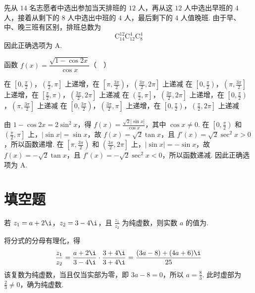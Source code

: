 \begin{solution}
先从 \(14\) 名志愿者中选出参加当天排班的 \(12\) 人，再从这 \(12\) 人中选出早班的 \(4\) 人，接着从剩下的 \(8\) 人中选出中班的 \(4\) 人，最后剩下的 \(4\) 人值晚班. 由于早、中、晚三班有区别，排班总数为
\[
\mathrm C_{14}^{12}\mathrm C_{12}^{4}\mathrm C_{8}^{4}
\]
因此正确选项为 A.
\end{solution}

\begin{problem}
函数 \(f(x)=\dfrac{\sqrt{1-\cos2x}}{\cos x}\)（\(\quad\)）

\choices
    {在 \(\left[0,\frac{\pi}{2}\right)\)，\(\left(\frac{\pi}{2},\pi\right]\) 上递增，在 \(\left[\pi,\frac{3\pi}{2}\right)\)，\(\left(\frac{3\pi}{2},2\pi\right]\) 上递减}
    {在 \(\left[0,\frac{\pi}{2}\right)\)，\(\left(\pi,\frac{3\pi}{2}\right]\) 上递增，在 \(\left[\frac{\pi}{2},\pi\right)\)，\(\left(\frac{3\pi}{2},2\pi\right]\) 上递减}
    {在 \(\left(\frac{\pi}{2},\pi\right]\)，\(\left(\frac{3\pi}{2},2\pi\right]\) 上递增，在 \(\left[0,\frac{\pi}{2}\right)\)，\(\left(\pi,\frac{3\pi}{2}\right]\) 上递减}
    {在 \(\left[0,\frac{3\pi}{2}\right)\)，\(\left(\frac{3\pi}{2},\pi\right]\) 上递增，在 \(\left[0,\frac{\pi}{2}\right)\)，\(\left(\frac{\pi}{2},2\pi\right]\) 上递减}
\end{problem}

\begin{solution}
由 \(1-\cos2x=2\sin^2x\)，得 \(f(x)=\frac{\sqrt2|\sin x|}{\cos x}\)，其中 \(\cos x\ne0\).
在 \(\left[0,\frac{\pi}{2}\right)\) 和 \(\left(\frac{\pi}{2},\pi\right]\) 上，\(|\sin x|=\sin x\)，故 \(f(x)=\sqrt2\tan x\)，且 \(f'(x)=\sqrt2\sec^2x>0\)，所以函数递增. 在 \(\left[\pi,\frac{3\pi}{2}\right)\) 和 \(\left(\frac{3\pi}{2},2\pi\right]\) 上，\(|\sin x|=-\sin x\)，故 \(f(x)=-\sqrt2\tan x\)，且 \(f'(x)=-\sqrt2\sec^2x<0\)，所以函数递减. 因此正确选项为 A.
\end{solution}

\section{填空题}
\begin{problem}
若 \(z_1=a+2\i\)，\(z_2=3-4\i\)，且 \(\frac{z_1}{z_2}\) 为纯虚数，则实数 \(a\) 的值为\fillinblank{}.
\end{problem}

\begin{solution}
将分式的分母有理化，得
\[
\frac{z_1}{z_2}=\frac{a+2\i}{3-4\i}\cdot\frac{3+4\i}{3+4\i}=\frac{(3a-8)+(4a+6)\i}{25}
\]
该复数为纯虚数，当且仅当实部为零，即 \(3a-8=0\)，所以 \(a=\frac83\). 此时虚部为 \(\frac23\ne0\)，确为纯虚数.
\end{solution}

